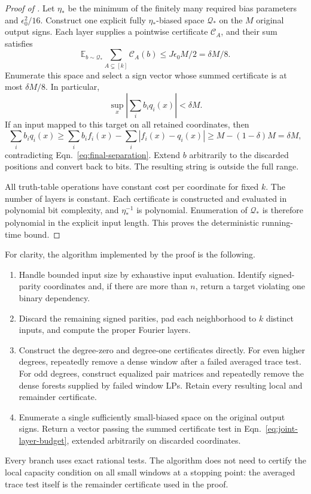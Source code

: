 \documentclass[letterpaper,11pt]{article}
\theoremstyle{definition}
\newcommand{\E}{\mathbb E}
\newcommand{\abs}[1]{\left|#1\right|}
\begin{document}
\begin{proof}[Proof of ]
Let $\eta_*$ be the minimum of the finitely many required bias
parameters and $\epsilon_0^2/16$. Construct one explicit fully
$\eta_*$-biased space $\mathcal Q_*$ on the $M$ original output
signs. Each layer supplies a pointwise certificate $\mathcal C_A$,
and their sum satisfies
\begin{equation}
 \E_{b\sim\mathcal Q_*}\sum_{A\subsetneq[k]}\mathcal C_A(b)
 \le J\epsilon_0M/2=\delta M/8.
 \label{eq:joint-layer-budget}
\end{equation}
Enumerate this space and select a sign vector whose summed
certificate is at most $\delta M/8$. In particular,
\begin{equation}
 \sup_x\abs{\sum_i b_iq_i(x)}<\delta M.
 \label{eq:final-separation}
\end{equation}
If an input mapped to this target on all retained coordinates, then
\[
 \sum_i b_iq_i(x)
 \ge\sum_i b_if_i(x)-\sum_i|f_i(x)-q_i(x)|
 \ge M-(1-\delta)M=\delta M,
\]
contradicting Eqn.~\eqref{eq:final-separation}.
Extend $b$ arbitrarily to the discarded positions and convert back
to bits. The resulting string is outside the full range.

All truth-table operations have constant cost per coordinate for
fixed $k$. The number of layers is constant. Each certificate is
constructed and evaluated in polynomial bit complexity, and
$\eta_*^{-1}$ is polynomial. Enumeration of $\mathcal Q_*$ is
therefore polynomial in the explicit input length. This proves
the deterministic running-time bound.
\end{proof}

For clarity, the algorithm implemented by the proof is the following.
\begin{enumerate}
\item Handle bounded input size by exhaustive input evaluation.
Identify signed-parity coordinates and, if there are more than $n$,
return a target violating one binary dependency.
\item Discard the remaining signed parities, pad each neighborhood
to $k$ distinct inputs, and compute the proper Fourier layers.
\item Construct the degree-zero and degree-one certificates directly.
For even higher degrees, repeatedly remove a dense window after a
failed averaged trace test. For odd degrees, construct equalized
pair matrices and repeatedly remove the dense forests supplied by
failed window LPs. Retain every resulting local and remainder
certificate.
\item Enumerate a single sufficiently small-biased space on the
original output signs. Return a vector passing the summed
certificate test in Eqn.~\eqref{eq:joint-layer-budget}, extended
arbitrarily on discarded coordinates.
\end{enumerate}
Every branch uses exact rational tests. The algorithm does not need
to certify the local capacity condition on all small windows at a
stopping point: the averaged trace test itself is the remainder
certificate used in the proof.
\end{document}
